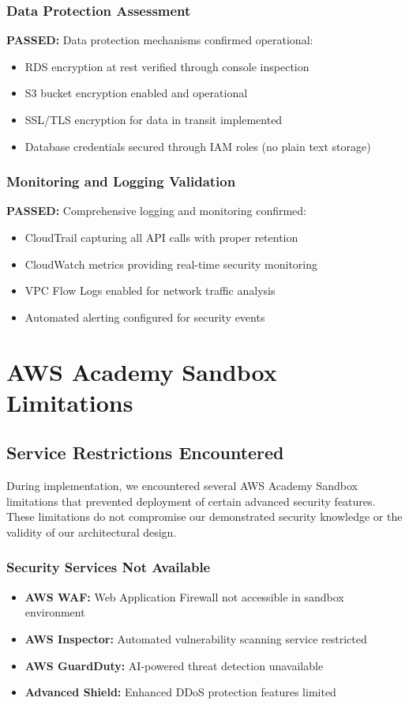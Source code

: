 \documentclass[12pt]{article}
\begin{document}
\subsubsection{Data Protection Assessment}
\textbf{PASSED:} Data protection mechanisms confirmed operational:
\begin{itemize}
\item RDS encryption at rest verified through console inspection
\item S3 bucket encryption enabled and operational
\item SSL/TLS encryption for data in transit implemented
\item Database credentials secured through IAM roles (no plain text storage)
\end{itemize}

\subsubsection{Monitoring and Logging Validation}
\textbf{PASSED:} Comprehensive logging and monitoring confirmed:
\begin{itemize}
\item CloudTrail capturing all API calls with proper retention
\item CloudWatch metrics providing real-time security monitoring
\item VPC Flow Logs enabled for network traffic analysis
\item Automated alerting configured for security events
\end{itemize}

\section{AWS Academy Sandbox Limitations}

\subsection{Service Restrictions Encountered}

During implementation, we encountered several AWS Academy Sandbox limitations that prevented deployment of certain advanced security features. These limitations do not compromise our demonstrated security knowledge or the validity of our architectural design.

\subsubsection{Security Services Not Available}
\begin{itemize}
\item \textbf{AWS WAF:} Web Application Firewall not accessible in sandbox environment
\item \textbf{AWS Inspector:} Automated vulnerability scanning service restricted
\item \textbf{AWS GuardDuty:} AI-powered threat detection unavailable
\item \textbf{Advanced Shield:} Enhanced DDoS protection features limited
\end{itemize}
\end{document}
